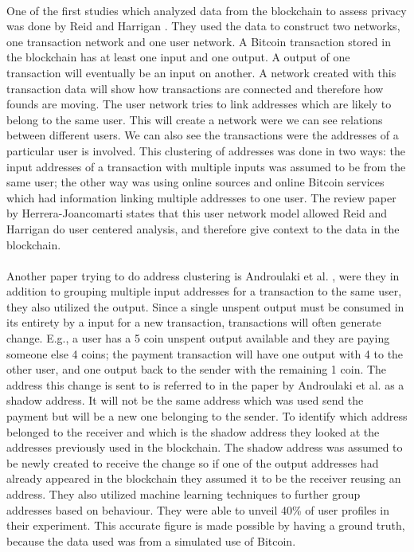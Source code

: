 \paragraph{}
One of the first studies which analyzed data from the blockchain to assess privacy was done by Reid and Harrigan \cite{reid2013analysis}.
They used the data to construct two networks, one transaction network and one user network. A Bitcoin transaction stored in the blockchain has at least one input and one output. A output of one transaction will eventually be an input on another. A network created with this transaction data will show how transactions are connected and therefore how founds are moving. The user network tries to link addresses which are likely to belong to the same user. This will create a network were we can see relations between different users. We can also see the transactions were the addresses of a particular user is involved. This clustering of addresses was done in two ways: the input addresses of a transaction with multiple inputs was assumed to be from the same user; the other way was using online sources and online Bitcoin services which had information linking multiple addresses to one user. The review paper by Herrera-Joancomart\́i\cite{herrera2015research} states that this user network model allowed Reid and Harrigan do user centered analysis, and therefore give context to the data in the blockchain.

\paragraph{}
Another paper trying to do address clustering is Androulaki et al. \cite{androulaki2013evaluating}, were they in addition to grouping multiple input addresses for a transaction to the same user, they also utilized the output. Since a single unspent output must be consumed in its entirety by a input for a new transaction, transactions will often generate change. E.g., a user has a 5 coin unspent output available and they are paying someone else 4 coins; the payment transaction will have one output with 4 to the other user, and one output back to the sender with the remaining 1 coin. The address this change is sent to is referred to in the paper by Androulaki et al. as a shadow address. It will not be the same address which was used send the payment but will be a new one belonging to the sender.
To identify which address belonged to the receiver and which is the shadow address they looked at the addresses previously used in the blockchain. The shadow address was assumed to be newly created to receive the change so if one of the output addresses had already appeared in the blockchain they assumed it to be the receiver reusing an address. They also utilized machine learning techniques to further group addresses based on behaviour. They were able to unveil 40\% of user profiles in their experiment. This accurate figure is made possible by having a ground truth, because the data used was from a simulated use of Bitcoin.

